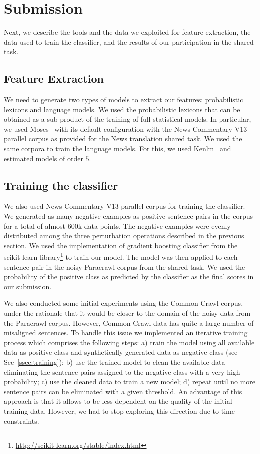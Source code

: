 \section{Submission}
\label{sec:results}

Next, we describe the tools and the data we exploited for feature extraction, the data used to train the classifier, and the results of our participation in the shared task.

\subsection{Feature Extraction}

We need to generate two types of models to extract our features: probabilistic lexicons and language models. We used the probabilistic lexicons that can be obtained as a sub product of the training of full statistical models. In particular, we used Moses~\cite{Moses} with its default configuration with the News Commentary V13 parallel corpus as provided for the News translation shared task. We used the same corpora to train the language models. For this, we used Kenlm~\cite{Kenlm} and estimated models of order $5$.


\subsection{Training the classifier}
\label{ssec:data}

We also used News Commentary V13 parallel corpus for training the classifier. We generated as many negative examples as positive sentence pairs in the corpus for a total of almost $600$k data points. The negative examples were evenly distributed among the three perturbation operations described in the previous section. We used the implementation of gradient boosting classifier from the scikit-learn library\footnote{\url{http://scikit-learn.org/stable/index.html}} to train our model. The model was then applied to each sentence pair in the noisy Paracrawl corpus from the shared task. We used the probability of the positive class as predicted by the classifier as the final scores in our submission.

We also conducted some initial experiments using the Common Crawl corpus, under the rationale that it would be closer to the domain of the noisy data from the Paracrawl corpus. However, Common Crawl data has quite a large number of misaligned sentences. To handle this issue we implemented an iterative training process which comprises the following steps: a) train the model using all available data as positive class and synthetically generated data as negative class (see Sec~\ref{ssec:training}); b) use the trained model to clean the available data eliminating the sentence pairs assigned to the negative class with a very high probability; c) use the cleaned data to train a new model; d) repeat until no more sentence pairs can be eliminated with a given threshold. An advantage of this approach is that it allows to be less dependent on the quality of the initial training data. However, we had to stop exploring this direction due to time constraints.


